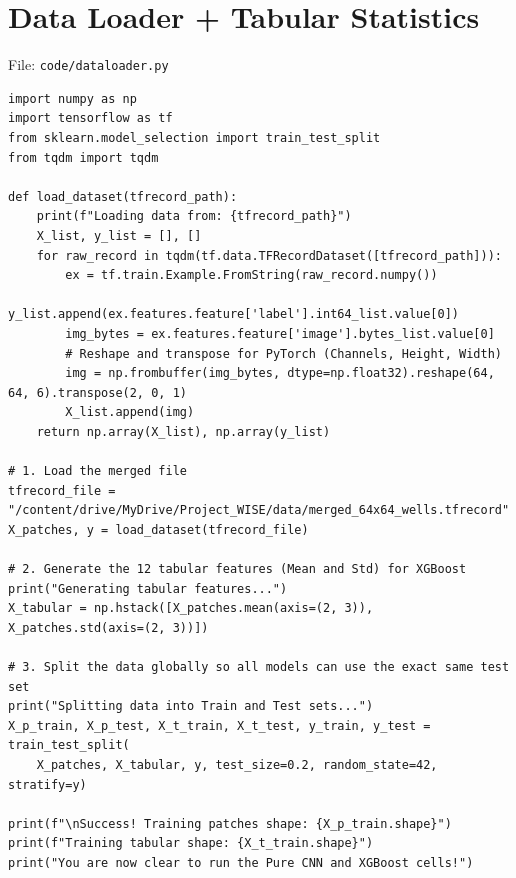 \documentclass[12pt,a4paper]{report}
\begin{document}
\section{Data Loader + Tabular Statistics}
\begin{wiseNote}
File: \texttt{code/dataloader.py}
\end{wiseNote}
\lstset{style=wise,language=Python}
\begin{lstlisting}
import numpy as np
import tensorflow as tf
from sklearn.model_selection import train_test_split
from tqdm import tqdm

def load_dataset(tfrecord_path):
    print(f"Loading data from: {tfrecord_path}")
    X_list, y_list = [], []
    for raw_record in tqdm(tf.data.TFRecordDataset([tfrecord_path])):
        ex = tf.train.Example.FromString(raw_record.numpy())
        y_list.append(ex.features.feature['label'].int64_list.value[0])
        img_bytes = ex.features.feature['image'].bytes_list.value[0]
        # Reshape and transpose for PyTorch (Channels, Height, Width)
        img = np.frombuffer(img_bytes, dtype=np.float32).reshape(64, 64, 6).transpose(2, 0, 1)
        X_list.append(img)
    return np.array(X_list), np.array(y_list)

# 1. Load the merged file
tfrecord_file = "/content/drive/MyDrive/Project_WISE/data/merged_64x64_wells.tfrecord"
X_patches, y = load_dataset(tfrecord_file)

# 2. Generate the 12 tabular features (Mean and Std) for XGBoost
print("Generating tabular features...")
X_tabular = np.hstack([X_patches.mean(axis=(2, 3)), X_patches.std(axis=(2, 3))])

# 3. Split the data globally so all models can use the exact same test set
print("Splitting data into Train and Test sets...")
X_p_train, X_p_test, X_t_train, X_t_test, y_train, y_test = train_test_split(
    X_patches, X_tabular, y, test_size=0.2, random_state=42, stratify=y)

print(f"\nSuccess! Training patches shape: {X_p_train.shape}")
print(f"Training tabular shape: {X_t_train.shape}")
print("You are now clear to run the Pure CNN and XGBoost cells!")
\end{lstlisting}
\end{document}
